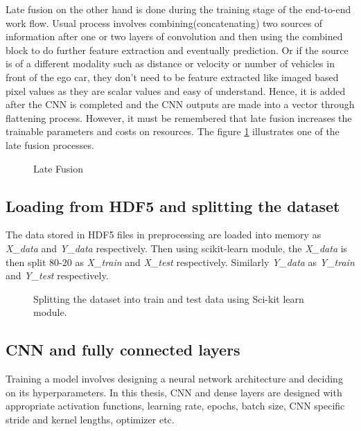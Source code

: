 Late fusion on the other hand is done during the training stage of the end-to-end work
flow. Usual process involves combining(concatenating) two sources of information after one
or two layers of convolution and then using the combined block to do further feature
extraction and eventually prediction. Or if the source is of a different modality such as
distance or velocity or number of vehicles in front of the ego car, they don't need to be
feature extracted like imaged based pixel values as they are scalar values and easy of
understand. Hence, it is added after the CNN is completed and the CNN outputs are made
into a vector through flattening process. However, it must be remembered that late fusion increases the
trainable parameters and costs on resources. The figure \ref{fig:latefusion} illustrates
one of the late fusion processes.

\begin{figure}[!ht]
    \centering
    \def\svgwidth{\textwidth}
    
    \caption{Late Fusion}
    \label{fig:latefusion}
\end{figure}


\subsection{Loading from HDF5 and splitting the dataset}
The data stored in HDF5 files in preprocessing are loaded into memory as \textit{X\_data} and
\textit{Y\_data} respectively. Then using scikit-learn module, the \textit{X\_data} is then split 80-20
as \textit{X\_train} and \textit{X\_test} respectively. Similarly \textit{Y\_data} as \textit{Y\_train} and
\textit{Y\_test} respectively.

\begin{wrapfigure}{l}{0.3\textwidth}
	\centering
    \def\svgwidth{0.3\textwidth}
    \caption{Splitting the dataset into train and test data using Sci-kit learn module.}
    \label{fig:splitdata}
\end{wrapfigure}

\subsection{CNN and fully connected layers}

Training a model involves designing a neural network architecture and deciding on its
hyperparameters. In this thesis, CNN and dense layers are designed with appropriate
activation functions, learning rate, epochs, batch size, CNN specific stride and kernel
lengths, optimizer etc.

